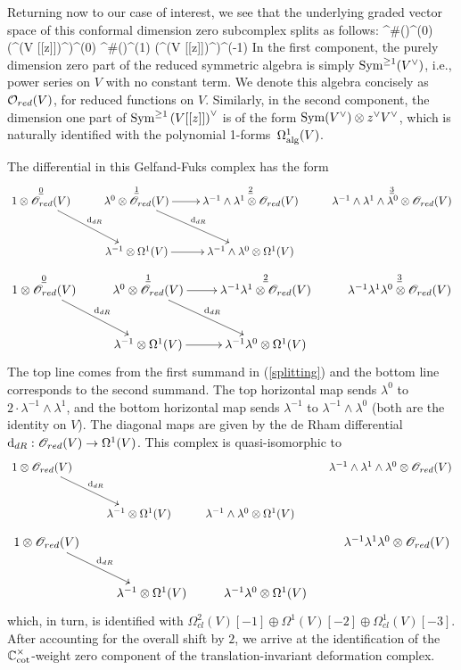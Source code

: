 Returning now to our case of interest, we see that the underlying graded vector space of this conformal dimension zero subcomplex splits as follows:
\be\label{splitting}
\clie^{\#}(\wone)^{(0)} \tensor \left(\Sym^{}\left(V [[z]]\right)^\vee \right)^{(0)} \oplus \clie^{\#}(\wone)^{(1)} \tensor \left(\Sym^{}\left(V [[z]]\right)^\vee\right)^{(-1)}
\ee
In the first component, the purely dimension zero part of the reduced symmetric algebra is simply ${\rm Sym}^{\geq 1}(V^\vee)$, i.e., power series on $V$ with no constant term.
We denote this algebra concisely as $\mathcal O_{red}(V)$, for reduced functions on $V$.
Similarly, in the second component, 
the dimension one part of ${\rm Sym}^{\geq 1}\left(V[[z]]\right)^\vee$ is of the form ${\rm Sym}(V^\vee) \otimes z^\vee V^\vee$, which is naturally identified with the polynomial 1-forms~$\Omega^1_{\rm alg}(V)$. 

The differential in this Gelfand-Fuks complex has the form
\[
\xymatrix{
\overset{\ul{0}}{1 \otimes \sO_{red}(V)} \ar[rd]^{\d_{dR}} & \overset{\ul{1}}{\lambda^0 \otimes \sO_{red}(V)} \ar[r] \ar[rd]^{\d_{dR}} & \overset{\ul{2}}{\lambda^{-1} \wedge \lambda^1 \otimes \sO_{red}(V)} & \overset{\ul{3}}{\lambda^{-1} \wedge \lambda^1 \wedge \lambda^0 \otimes \sO_{red}(V)} \\
 & \lambda^{-1} \otimes \Omega^1(V) \ar[r] & \lambda^{-1} \wedge \lambda^0 \otimes\Omega^1(V) &
}
\]
\[
\xymatrix{
\overset{\ul{0}}{1 \otimes \sO_{red}(V)} \ar[rd]^{\d_{dR}} & \overset{\ul{1}}{\lambda^0 \otimes \sO_{red}(V)} \ar[r] \ar[rd]^{\d_{dR}} & \overset{\ul{2}}{\lambda^{-1}  \lambda^1 \otimes \sO_{red}(V)} & \overset{\ul{3}}{\lambda^{-1}  \lambda^1  \lambda^0 \otimes \sO_{red}(V)} \\
 & \lambda^{-1} \otimes \Omega^1(V) \ar[r] & \lambda^{-1}  \lambda^0 \otimes\Omega^1(V) &
}
\]
The top line comes from the first summand in (\ref{splitting}) and the bottom line corresponds to the second summand.
The top horizontal map sends $\lambda^0$ to $2 \cdot \lambda^{-1} \wedge \lambda^1$, 
and the bottom horizontal map sends $\lambda^{-1}$ to $\lambda^{-1} \wedge \lambda^0$ (both are the identity on $V$). 
The diagonal maps are given by the de Rham differential ${\rm d}_{dR} : \mathscr O_{red}(V) \to \Omega^1(V)$. 
This complex is quasi-isomorphic to 
\[
\xymatrix{
1 \otimes \sO_{red}(V) \ar[rd]^{\d_{dR}} & & & \lambda^{-1} \wedge \lambda^1 \wedge \lambda^0 \otimes \sO_{red}(V) \\
 & \lambda^{-1} \otimes \Omega^1(V) & \lambda^{-1} \wedge \lambda^0 \otimes\Omega^1(V) &
}
\]
\[
\xymatrix{
1 \otimes \sO_{red}(V) \ar[rd]^{\d_{dR}} & & & \lambda^{-1}  \lambda^1  \lambda^0 \otimes \sO_{red}(V) \\
 & \lambda^{-1} \otimes \Omega^1(V) & \lambda^{-1}  \lambda^0 \otimes\Omega^1(V) &
}
\]
which, in turn, is identified with $\Omega^{2}_{cl}(V)[-1] \oplus \Omega^1(V)[-2] \oplus \Omega^1_{cl}(V)[-3]$. 
After accounting for the overall shift by $2$, 
we arrive at the identification of the $\mathbb C_{\rm cot}^\times$-weight zero component of the translation-invariant deformation complex.

